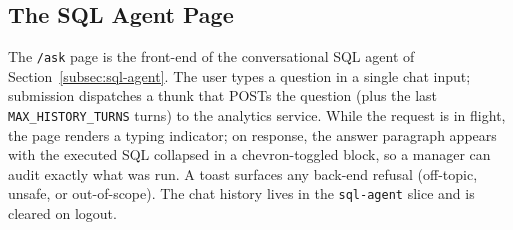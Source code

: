 \subsection{The SQL Agent Page}

The \texttt{/ask} page is the front-end of the conversational SQL agent of Section~\ref{subsec:sql-agent}. The user types a question in a single chat input; submission dispatches a thunk that POSTs the question (plus the last \texttt{MAX\_HISTORY\_TURNS} turns) to the analytics service. While the request is in flight, the page renders a typing indicator; on response, the answer paragraph appears with the executed SQL collapsed in a chevron-toggled block, so a manager can audit exactly what was run. A toast surfaces any back-end refusal (off-topic, unsafe, or out-of-scope). The chat history lives in the \texttt{sql-agent} slice and is cleared on logout.
